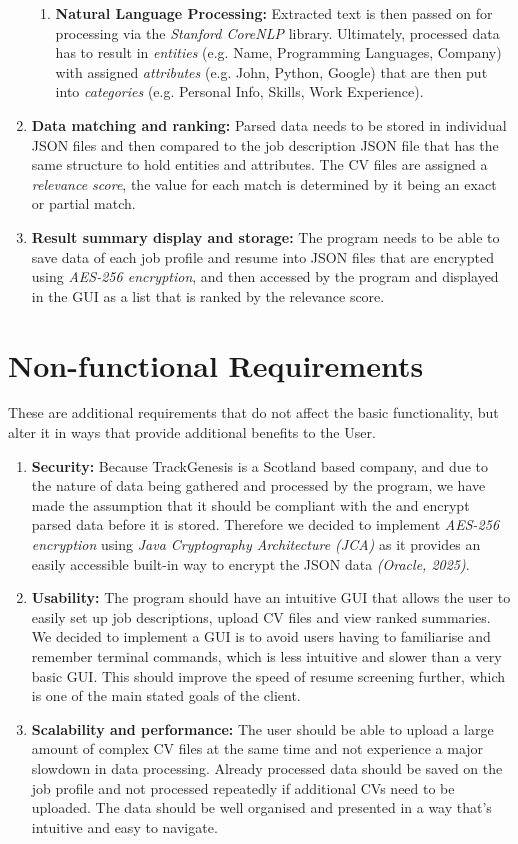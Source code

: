 \begin{enumerate}
\begin{enumerate}
                    \item \textbf{Natural Language Processing:} Extracted text is then passed on for processing via the \textit{Stanford CoreNLP} library. Ultimately, processed data has to result in \textit{entities} (e.g. Name, Programming Languages, Company) with assigned \textit{attributes} (e.g. John, Python, Google) that are then put into \textit{categories} (e.g. Personal Info, Skills, Work Experience).
                \end{enumerate}
            \item \textbf{Data matching and ranking:} Parsed data needs to be stored in individual JSON files and then compared to the job description JSON file that has the same structure to hold entities and attributes. The CV files are assigned a \textit{relevance score}, the value for each match is determined by it being an exact or partial match.
            \item \textbf{Result summary display and storage:} The program needs to be able to save data of each job profile and resume into JSON files that are encrypted using \textit{AES-256 encryption}, and then accessed by the program and displayed in the GUI as a list that is ranked by the relevance score.
        \end{enumerate}
    \section{Non-functional Requirements}
        These are additional requirements that do not affect the basic functionality, but alter it in ways that provide additional benefits to the User.
        \begin{enumerate}
            \item \textbf{Security:} Because TrackGenesis is a Scotland based company, and due to the nature of data being gathered and processed by the program, we have made the assumption that it should be compliant with the \textcite{ukgdpr2025} and encrypt parsed data before it is stored. Therefore we decided to implement \textit{AES-256 encryption} using \textit{Java Cryptography Architecture (JCA)} as it provides an easily accessible built-in way to encrypt the JSON data \textit{(Oracle, 2025)}.
            \item \textbf{Usability:} The program should have an intuitive GUI that allows the user to easily set up job descriptions, upload CV files and view ranked summaries. We decided to implement a GUI is to avoid users having to familiarise and remember terminal commands, which is less intuitive and slower than a very basic GUI. This should improve the speed of resume screening further, which is one of the main stated goals of the client.
            \item \textbf{Scalability and performance:} The user should be able to upload a large amount of complex CV files at the same time and not experience a major slowdown in data processing. Already processed data should be saved on the job profile and not processed repeatedly if additional CVs need to be uploaded. The data should be well organised and presented in a way that's intuitive and easy to navigate.
        \end{enumerate}
    
